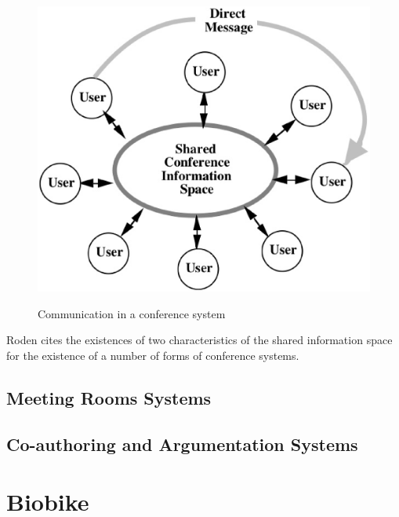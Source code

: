 \begin{figure}[htp]
  \caption{Communication in a conference system\cite{journals/iwc/Rodden91}}
  \centering
  \includegraphics[scale=.5]{ConfSys.eps}
  \label{CONF_SYS}
\end{figure}

Roden cites the existences of two characteristics of the shared
information space for the existence of a number of forms of conference systems.
\subsection{Meeting Rooms Systems}

\subsection{Co-authoring and Argumentation Systems}

\section{Biobike}














